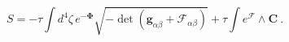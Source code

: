 \begin{equation}
S=-\tau\int d^4\zeta\,  e^{- \bm{\Phi}}\sqrt{-\det \left(
\bm{g}_{\alpha\beta} 
+ \bm{\mathcal{F}}_{\alpha\beta}\right)}+\tau\int 
e^{\bm{\mathcal{F}}} \wedge\bm{C}\ .
\label{susyaction}
\end{equation}

